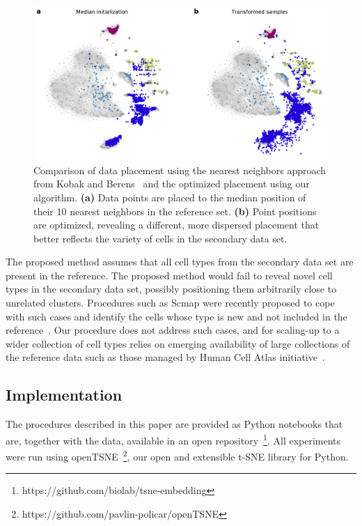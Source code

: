 \documentclass[runningheads]{llncs}
\begin{document}
\begin{figure}[htbp]
\includegraphics[width=\textwidth]{figures/optimization_retina.pdf}
\caption{Comparison of data placement using the nearest neighbors approach from Kobak
and Berens~\cite{art_of_using_tsne} and the optimized placement using our algorithm.
{\bf (a)} Data points are placed to the median position of their 10 nearest
neighbors in the reference set. {\bf (b)} Point positions are optimized,
revealing a different, more dispersed placement that better reflects the
variety of cells in the secondary data set.}
\label{fig:optimization}
\end{figure}

The proposed method assumes that all cell types from the secondary data set are
present in the reference. The proposed method would fail to reveal novel cell
types in the secondary data set, possibly positioning them arbitrarily close to
unrelated clusters. Procedures such as Scmap were recently
proposed to cope with such cases and identify the cells whose type is new and
not included in the reference~\cite{scmap}. Our procedure does not address such cases, and
for scaling-up to a wider collection of cell types relies on emerging
availability of large collections of the reference data such as those managed
by Human Cell Atlas initiative~\cite{hca}. 

\subsection{Implementation\label{sec:implementation}}

The procedures described in this paper are provided as Python notebooks that
are, together with the data, available in an open
repository~\footnote{https://github.com/biolab/tsne-embedding}. All experiments
were run using openTSNE~\footnote{https://github.com/pavlin-policar/openTSNE},
our open and extensible t-SNE library for Python.
\end{document}
